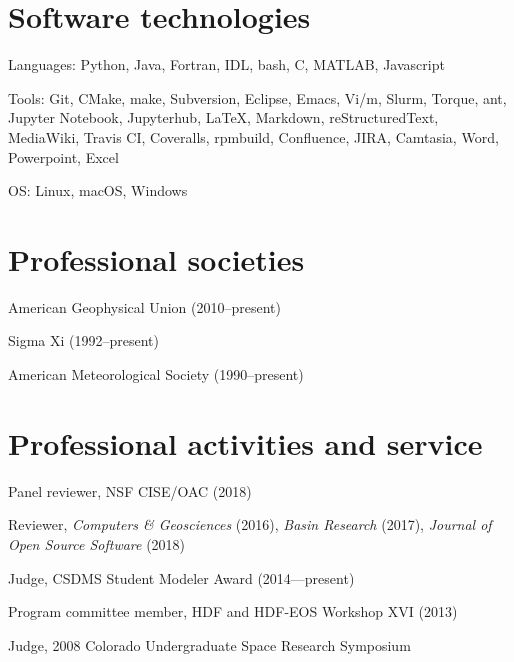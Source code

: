 \documentclass[letterpaper]{resume}
\begin{document}

\section{Software technologies}

\vspace{1.0em}
\begin{compactitem}[\itembullet]
  \item Languages: Python, Java, Fortran, IDL, bash, C, MATLAB, Javascript
  \item Tools: Git, CMake, make, Subversion, Eclipse, Emacs,
    Vi/m, Slurm, Torque, ant, Jupyter Notebook,
    Jupyterhub, \LaTeX, Markdown, reStructuredText, MediaWiki,
    Travis CI, Coveralls, rpmbuild, Confluence, JIRA, Camtasia,
    Word, Powerpoint, Excel
  \item OS: Linux, macOS, Windows
\end{compactitem}


\section{Professional societies}

\vspace{1.0em}
\begin{compactitem}[\itembullet]
  \item American Geophysical Union (2010--present) 
  \item Sigma Xi (1992--present)
  \item American Meteorological Society (1990--present)
\end{compactitem}


\section{Professional activities and service}

\vspace{1.0em}
\begin{compactitem}[\itembullet]
  \item Panel reviewer, NSF CISE/OAC (2018)
  \item Reviewer, \textit{Computers \& Geosciences} (2016),
    \textit{Basin Research} (2017), \textit{Journal of Open Source
      Software} (2018)
  \item Judge, CSDMS Student Modeler Award (2014---present)
  \item Program committee member, HDF and HDF-EOS Workshop XVI (2013)
  \item Judge, 2008 Colorado Undergraduate Space Research Symposium
\end{compactitem}
\end{document}
